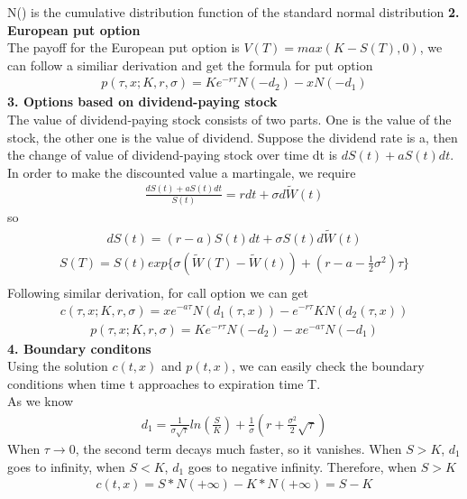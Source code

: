 \documentclass[a4paper]{article}
\begin{document}
N() is the cumulative distribution function of the standard normal distribution
{\bf 2. European put option}\\
The payoff for the European put option is $V(T) = max(K - S(T), 0)$, we can follow a similiar derivation and get the formula for put option
\begin{align*}
	p(\tau,x; K, r, \sigma) = Ke^{-r\tau}N(-d_2)-xN(-d_1)
\end{align*}
{\bf 3. Options based on dividend-paying stock}\\
The value of dividend-paying stock consists of two parts. One is the value of the stock, the other one is the value of dividend. Suppose the dividend rate is a, then the change of value of dividend-paying stock over time dt is $dS(t) + aS(t)dt$. In order to make the discounted value a martingale, we require 
\begin{align*}
	\frac{dS(t) + aS(t)dt}{S(t)} = rdt + \sigma d \tilde W(t)
\end{align*}
so
\begin{align*}
	dS(t) = (r-a) S(t)dt + \sigma S(t) d \tilde W(t)
\end{align*}
\begin{align*}
	S(T) = S(t) exp\{\sigma(\tilde W(T) -\tilde W(t)) + (r - a - \frac{1}{2} \sigma^2) \tau\} \\
\end{align*}
Following similar derivation, for call option we can get
\begin{align*}
	c(\tau,x; K, r, \sigma) = xe^{-a\tau} N(d_1(\tau,x)) - e^{-r\tau} K N(d_2(\tau,x))
\end{align*}
\begin{align*}
	p(\tau,x; K, r, \sigma) = Ke^{-r\tau} N(-d_2)-xe^{-a \tau}N(-d_1)
\end{align*}
{\bf 4. Boundary conditons}\\
Using the solution $c(t,x)$ and $p(t,x)$, we can easily check the boundary conditions when
time t approaches to expiration time T.\\
As we know
\begin{align*}
	d_1 = \frac{1}{\sigma \sqrt{\tau}}ln(\frac{S}{K}) 
	+ \frac{1}{\sigma}(r+\frac{\sigma^2}{2}\sqrt{\tau})
\end{align*}
When $\tau \to 0$, the second term decays much faster, so it vanishes. When $S>K$, $d_1$ goes to infinity, when $S<K$, $d_1$ goes to negative infinity.
Therefore, when $S>K$
\begin{align*}
	c(t,x) = S*N(+\infty) - K*N(+\infty) = S-K
\end{align*}
\end{document}
